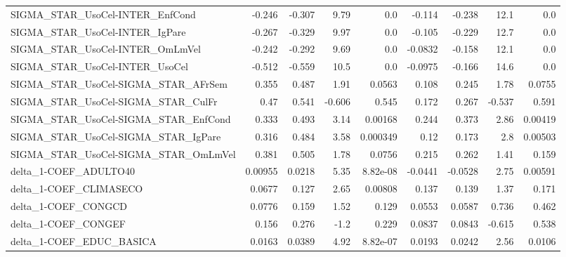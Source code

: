\begin{tabular}{lrrrrrrrr}
SIGMA\_STAR\_UsoCel-INTER\_EnfCond       &      -0.246 &       -0.307 &    9.79 &      0.0 &     -0.114 &      -0.238 &         12.1 &           0.0 \\
SIGMA\_STAR\_UsoCel-INTER\_IgPare        &      -0.267 &       -0.329 &    9.97 &      0.0 &     -0.105 &      -0.229 &         12.7 &           0.0 \\
SIGMA\_STAR\_UsoCel-INTER\_OmLmVel       &      -0.242 &       -0.292 &    9.69 &      0.0 &    -0.0832 &      -0.158 &         12.1 &           0.0 \\
SIGMA\_STAR\_UsoCel-INTER\_UsoCel        &      -0.512 &       -0.559 &    10.5 &      0.0 &    -0.0975 &      -0.166 &         14.6 &           0.0 \\
SIGMA\_STAR\_UsoCel-SIGMA\_STAR\_AFrSem   &       0.355 &        0.487 &    1.91 &   0.0563 &      0.108 &       0.245 &         1.78 &        0.0755 \\
SIGMA\_STAR\_UsoCel-SIGMA\_STAR\_CulFr    &        0.47 &        0.541 &  -0.606 &    0.545 &      0.172 &       0.267 &       -0.537 &         0.591 \\
SIGMA\_STAR\_UsoCel-SIGMA\_STAR\_EnfCond  &       0.333 &        0.493 &    3.14 &  0.00168 &      0.244 &       0.373 &         2.86 &       0.00419 \\
SIGMA\_STAR\_UsoCel-SIGMA\_STAR\_IgPare   &       0.316 &        0.484 &    3.58 & 0.000349 &       0.12 &       0.173 &          2.8 &       0.00503 \\
SIGMA\_STAR\_UsoCel-SIGMA\_STAR\_OmLmVel  &       0.381 &        0.505 &    1.78 &   0.0756 &      0.215 &       0.262 &         1.41 &         0.159 \\
delta\_1-COEF\_ADULTO40                 &     0.00955 &       0.0218 &    5.35 & 8.82e-08 &    -0.0441 &     -0.0528 &         2.75 &       0.00591 \\
delta\_1-COEF\_CLIMASECO                &      0.0677 &        0.127 &    2.65 &  0.00808 &      0.137 &       0.139 &         1.37 &         0.171 \\
delta\_1-COEF\_CONGCD                   &      0.0776 &        0.159 &    1.52 &    0.129 &     0.0553 &      0.0587 &        0.736 &         0.462 \\
delta\_1-COEF\_CONGEF                   &       0.156 &        0.276 &    -1.2 &    0.229 &     0.0837 &      0.0843 &       -0.615 &         0.538 \\
delta\_1-COEF\_EDUC\_BASICA              &      0.0163 &       0.0389 &    4.92 & 8.82e-07 &     0.0193 &      0.0242 &         2.56 &        0.0106 \\

\end{tabular}

